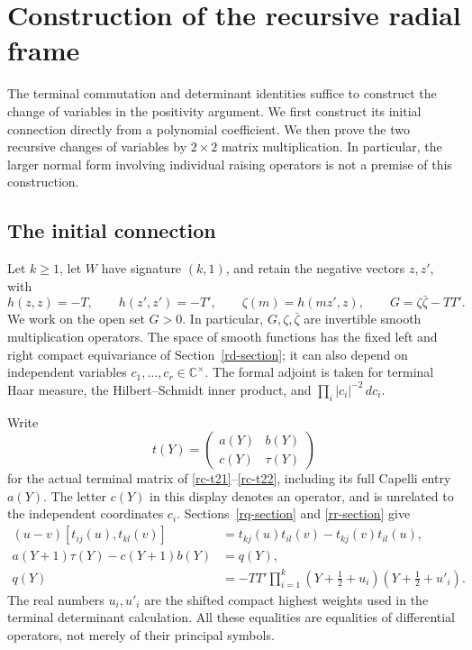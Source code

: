 \section{Construction of the recursive radial frame}
\label{re-section}

The terminal commutation and determinant identities suffice to
construct the change of variables in the positivity argument.
We first construct its initial connection directly from a
polynomial coefficient.  We then prove the two recursive changes
of variables by \(2\times2\) matrix multiplication.  In particular,
the larger normal form involving individual raising operators is
not a premise of this construction.

\subsection{The initial connection}

Let \(k\geq1\), let \(W\) have signature \((k,1)\), and retain
the negative vectors \(z,z'\), with
\[
 h(z,z)=-T,\qquad h(z',z')=-T',\qquad
 \zeta(m)=h(mz',z),\qquad G=\zeta\bar\zeta-TT'.
\]
We work on the open set \(G>0\).  In particular, \(G,\zeta,\bar\zeta\)
are invertible smooth multiplication operators.  The space of
smooth functions has the fixed left and right compact equivariance
of Section~\ref{rd-section}; it can also depend on independent
variables \(c_1,\ldots,c_r\in\mathbb C^\times\).
The formal adjoint is taken for terminal Haar measure, the
Hilbert--Schmidt inner product, and
\(\prod_i |c_i|^{-2}\,dc_i\).

Write
\[
 t(Y)=
 \begin{pmatrix} a(Y)&b(Y)\\c(Y)&\tau(Y)\end{pmatrix}
\]
for the actual terminal matrix of
\eqref{rc-t21}--\eqref{rc-t22}, including its full Capelli
entry \(a(Y)\).  The letter \(c(Y)\) in this display denotes
an operator, and is unrelated to the independent coordinates
\(c_i\).  Sections~\ref{rq-section} and \ref{rr-section} give
\begin{align}
 (u-v)[t_{ij}(u),t_{kl}(v)]
 &=t_{kj}(u)t_{il}(v)-t_{kj}(v)t_{il}(u),       \label{re-rtt}\\
 a(Y+1)\tau(Y)-c(Y+1)b(Y)&=q(Y),                \label{re-one-det}\\
 q(Y)&=-TT'\prod_{i=1}^k
       (Y+\tfrac12+u_i)(Y+\tfrac12+u'_i).       \label{re-q}
\end{align}
The real numbers \(u_i,u'_i\) are the shifted compact highest
weights used in the terminal determinant calculation.
All these equalities are equalities of differential operators,
not merely of their principal symbols.

